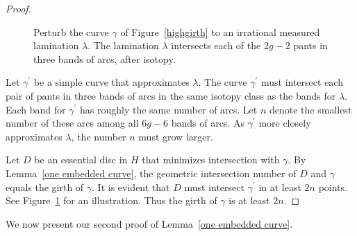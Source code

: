 \begin{proof}
\begin{figure}
\caption{
Perturb the curve $\gamma$ of Figure~\ref{highgirth}  
to an irrational measured lamination $\lambda$.
The lamination $\lambda$ intersects each of the $2g-2$ pants 
in three bands of arcs, after isotopy.}
\label{highgirthpant}
\end{figure}

Let $\gamma^\prime$ be a simple curve that approximates $\lambda$.
The curve $\gamma^\prime$ must intersect each pair of pants in 
three bands of arcs in the same isotopy class as the bands for 
$\lambda$.  Each band for $\gamma^\prime$ has roughly the same 
number of arcs.  Let $n$ denote the smallest number of these 
arcs among all $6g-6$ bands of arcs.  As $\gamma^\prime$ more 
closely approximates $\lambda$, the number $n$ must grow larger.

Let $D$ be an essential disc in $H$ that minimizes intersection with $\gamma$.  By Lemma~\ref{one embedded curve}, the geometric intersection number of $D$ and $\gamma$ equals the girth of $\gamma$.  It is evident that $D$ must intersect $\gamma^\prime$ in at least $2n$ points.  See Figure~\ref{highgirthpant} for an illustration.  Thus the girth of $\gamma$ is at least $2n$.
\end{proof}

We now present our second proof of Lemma~\ref{one embedded curve}.


